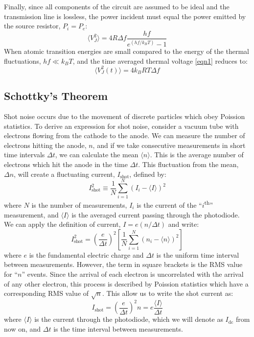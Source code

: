 \documentclass[12pt]{article}
\begin{document}
	Finally, since all components of the circuit are assumed to be ideal and the transmission line is lossless, the power incident must equal the power emitted by the source resistor, $P_i = P_e$:
	\begin{equation}
		\langle V_J^2 \rangle = 4R\Delta f \frac{hf}{e^{(hf/k_BT)}-1}
		\label{eqn1}
	\end{equation}
	When atomic transition energies are small compared to the energy of the thermal fluctuations, $hf \ll k_BT$, and the time averaged thermal voltage \cref{eqn1} reduces to:	
	\begin{equation}
		\langle V^2_J (t) \rangle = 4 k_B RT \Delta f 
		\label{nyquistEqn}
	\end{equation}

		
	\subsection{Schottky's Theorem}
	Shot noise occurs due to the movement of discrete particles which obey Poission statistics. To derive an expression for shot noise, consider a vacuum tube with electrons flowing from the cathode to the anode. We can measure the number of electrons hitting the anode, $n$, and if we take consecutive measurements in short time intervals $\Delta t$, we can calculate the mean $\langle n \rangle$. This is the average number of electrons which hit the anode in the time $\Delta t$. This fluctuation from the mean, $\Delta n$, will create a fluctuating current, $I_{\text{shot}}$, defined by:
	\begin{equation}
		I_{\text{shot}}^2 \equiv \frac{1}{N} \sum_{i=1}^N\left( I_i - \langle I \rangle \right) ^2
	\end{equation}
	where $N$ is the number of measurements, $I_i$ is the current of the ``$i$\textsuperscript{th}'' measurement, and $\langle I \rangle$ is the averaged current passing through the photodiode. We can apply the definition of current, $I = e(n/\Delta t)$ and write:
	\begin{equation}
		I_{\text{shot}}^2 = \left( \frac{e}{\Delta t} \right)^2 \left[ \frac{1}{N} \sum_{i=1}^{N} \left( n_i - \langle n \rangle \right) ^2 \right]
	\end{equation}
	where $e$ is the fundamental electric charge and $\Delta t$ is the uniform time interval between measurements. However, the term in square brackets is the RMS value for ``$n$'' events. Since the arrival of each electron is uncorrelated with the arrival of any other electron, this process is described by Poission statistics which have a corresponding RMS value of $\sqrt{n}$. This allow us to write the shot current as:
	\begin{equation}
		I_{\text{shot}} = \left( \frac{e}{\Delta t} \right)^2 n = e \frac{\langle I \rangle}{\Delta t}
	\end{equation}
	where $\langle I \rangle$ is the current through the photodiode, which we will denote as $I_{\text{dc}}$ from now on, and $\Delta t$ is the time interval between measurements. 
	
\end{document}
